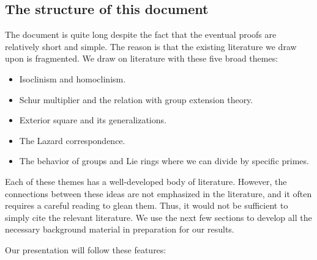 \documentclass{ucetd}
\begin{document}

\subsection{The structure of this document}

The document is quite long despite the fact that the eventual proofs
are relatively short and simple. The reason is that the existing
literature we draw upon is fragmented. We draw on literature with
these five broad themes:

\begin{itemize}
\item Isoclinism and homoclinism.
\item Schur multiplier and the relation with group extension theory.
\item Exterior square and its generalizations.
\item The Lazard correspondence.
\item The behavior of groups and Lie rings where we can divide by
  specific primes.
\end{itemize}

Each of these themes has a well-developed body of literature. However,
the connections between these ideas are not emphasized in the
literature, and it often requires a careful reading to glean
them. Thus, it would not be sufficient to simply cite the relevant
literature. We use the next few sections to develop all the necessary
background material in preparation for our results.

Our presentation will follow these features:
\end{document}
